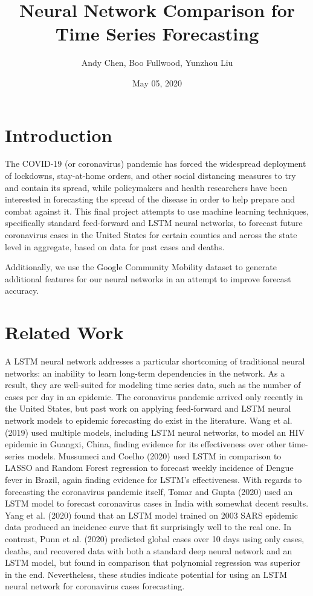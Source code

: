 ﻿\documentclass{article}
\title{Neural Network Comparison for Time Series Forecasting}
\author{Andy Chen, Boo Fullwood, Yunzhou Liu}
\date{May 05, 2020}
\begin{document}
\maketitle

\begin{multicols}{2}
  
\section*{Introduction}

The COVID-19 (or coronavirus) pandemic has forced the widespread deployment of
lockdowns, stay-at-home orders, and other social distancing measures to try and
contain its spread, while policymakers and health researchers have been
interested in forecasting the spread of the disease in order to help prepare and
combat against it. This final project attempts to use machine learning
techniques, specifically standard feed-forward and LSTM neural networks, to
forecast future coronavirus cases in the United States for certain counties and
across the state level in aggregate, based on data for past cases and deaths.

Additionally, we use the Google Community Mobility dataset to generate
additional features for our neural networks in an attempt to improve forecast
accuracy.

\section*{Related Work}


A LSTM neural network addresses a particular shortcoming of traditional neural
networks: an inability to learn long-term dependencies in the network. As a
result, they are well-suited for modeling time series data, such as the number
of cases per day in an epidemic. The coronavirus pandemic arrived only recently
in the United States, but past work on applying feed-forward and LSTM neural
network models to epidemic forecasting do exist in the literature. Wang et al.
(2019) used multiple models, including LSTM neural networks, to model an HIV
epidemic in Guangxi, China, finding evidence for its effectiveness over other
time-series models. Mussumeci and Coelho (2020) used LSTM in comparison to LASSO
and Random Forest regression to forecast weekly incidence of Dengue fever in
Brazil, again finding evidence for LSTM’s effectiveness. With regards to
forecasting the coronavirus pandemic itself, Tomar and Gupta (2020) used an LSTM
model to forecast coronavirus cases in India with somewhat decent results. Yang
et al. (2020) found that an LSTM model trained on 2003 SARS epidemic data
produced an incidence curve that fit surprisingly well to the real one. In
contrast, Punn et al. (2020) predicted global cases over 10 days using only
cases, deaths, and recovered data with both a standard deep neural network and
an LSTM model, but found in comparison that polynomial regression was superior
in the end. Nevertheless, these studies indicate potential for using an LSTM
neural network for coronavirus cases forecasting.\\


\end{multicols}
\end{document}
